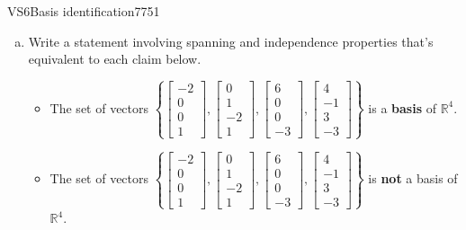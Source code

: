 \begin{exercise}{VS6}{Basis identification}{7751} 
\begin{exerciseStatement} 

\begin{enumerate}[(a)]
\item  

 Write a statement involving spanning and independence properties that's equivalent to each claim below. 

 

\begin{itemize}
\item  

 The set of vectors \(\left\{ \left[\begin{array}{c}
-2 \\
0 \\
0 \\
1
\end{array}\right] , \left[\begin{array}{c}
0 \\
1 \\
-2 \\
1
\end{array}\right] , \left[\begin{array}{c}
6 \\
0 \\
0 \\
-3
\end{array}\right] , \left[\begin{array}{c}
4 \\
-1 \\
3 \\
-3
\end{array}\right] \right\}\) is a \textbf{basis} of \(\mathbb{R}^4\). 

 
\item  

 The set of vectors \(\left\{ \left[\begin{array}{c}
-2 \\
0 \\
0 \\
1
\end{array}\right] , \left[\begin{array}{c}
0 \\
1 \\
-2 \\
1
\end{array}\right] , \left[\begin{array}{c}
6 \\
0 \\
0 \\
-3
\end{array}\right] , \left[\begin{array}{c}
4 \\
-1 \\
3 \\
-3
\end{array}\right] \right\}\) is \textbf{not} a basis of \(\mathbb{R}^4\). 


\end{itemize}
\end{enumerate}
\end{exerciseStatement}
\end{exercise}
